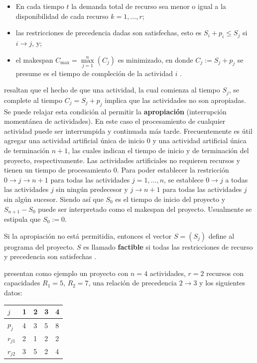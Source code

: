 \documentclass[spanish,draft,12pt,headsepline,footsepline,paper=letter]{scrreprt}
\begin{document}
\begin{itemize}
  \item En cada tiempo $t$ la demanda total de recurso sea menor o igual a la disponibilidad de cada recurso $k=1,\dots,r$;
  \item las restricciones de precedencia dadas son satisfechas, esto es $S_i+p_i \leq S_j$ si $i \to j$, y;
  \item el makespan $C_{\max}=\overset{n}{\underset{j=1}{\max}}(C_j)$ es minimizado, en donde $C_j:=S_j+p_j$ se presume es el tiempo de compleción de la actividad $i$ \citep[p.~2]{Robert2010}.
  \end{itemize}

\citet[p.~2,~3]{Robert2010} resaltan que el hecho de que una actividad, la cual comienza al tiempo $S_j$, se complete al tiempo $C_j=S_j+p_j$ implica que las actividades no son apropiadas. Se puede relajar esta condición al permitir la \textbf{apropiación} (interrupción momentánea de actividades). En este caso el procesamiento de cualquier actividad puede ser interrumpida y continuada más tarde.
Frecuentemente es útil agregar una actividad artificial única de inicio $0$ y una actividad artificial única de terminación $n+1$, las cuales indican el tiempo de inicio y de terminación del proyecto, respectivamente. Las actividades artificiales no requieren recursos y tienen un tiempo de procesamiento $0$. Para poder establecer la restricción $0 \to j \to n+1$ para todas las actividades $j=1,\dots,n$, se establece $0 \to j$ a todas las actividades $j$ sin ningún predecesor y $j \to n+1$ para todas las actividades $j$ sin algún sucesor. Siendo así que $S_0$ es el tiempo de inicio del proyecto y $S_{n+1}-S_0$ puede ser interpretado como el makespan del proyecto. Usualmente se estipula que $S_0:=0$.

Si la apropiación no está permitidia, entonces el vector $S=(S_j)$ define al programa del proyecto. $S$ es llamado \textbf{factible} si todas las restricciones de recurso y precedencia son satisfechas \citep[p.~3]{Robert2010}. 

\citet[p.~3]{Robert2010} presentan como ejemplo un proyecto con $n=4$ actividades, $r=2$ recursos con capacidades $R_1=5$, $R_2=7$, una relación de precedencia $2 \to 3$ y los siguientes datos:

\begin{table}[h]
\centering
\begin{tabular}{l|llll}
\toprule
  $j$      & 1 & 2 & 3 & 4 \\
  \midrule
  $p_j$    & 4 & 3 & 5 & 8 \\
  $r_{j1}$ & 2 & 1 & 2 & 2 \\
  $r_{j2}$ & 3 & 5 & 2 & 4 \\
  \bottomrule
\end{tabular}
\label{tab:project_data}
\end{table}
\end{document}
